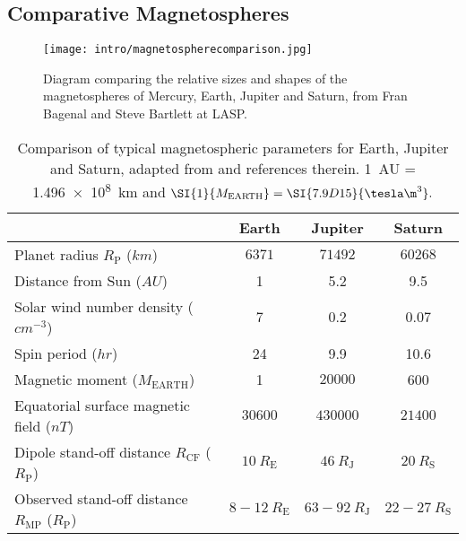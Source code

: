 \subsection{Comparative Magnetospheres}\label{intro:sec:comparativemagnetospheres}
\begin{figure}
\centering
\noindent\texttt{[image: intro/magnetospherecomparison.jpg]}
\caption[Diagram of Mercury, Earth, Jupiter and Saturn magnetospheres.]{Diagram comparing the relative sizes and shapes of the magnetospheres of Mercury, Earth, Jupiter and Saturn, from Fran Bagenal and Steve Bartlett at LASP.}
\label{intro:fig:magnetospherecomparison}
\end{figure}
\begin{table}
\caption[Comparison of typical magnetospheric parameters for Earth, Jupiter and Saturn.]{Comparison of typical magnetospheric parameters for Earth, Jupiter and Saturn, adapted from \citet{bagenal2014} and references therein. \SI{1}{AU} = \SI{1.496e8}{km} and $\SI{1}{M_\mathrm{EARTH}} = \SI{7.9D15}{\tesla \m^3}.$}\label{intro:table:magnetospherecomparison}
\centering
\begin{tabular}{l c c c}
\hline
 																															& Earth						& Jupiter			& Saturn \\
\hline
Planet radius $R_\mathrm{P}$ ($\si{km}$)															& $\num{6371}$										&	$\num{71492}$			&	$\num{60268}$ \\
Distance from Sun ($\si{AU}$)																			&	1							&	5.2						& 9.5		\\
Solar wind number density ($\si{cm^{-3}}$)														& 7							&	0.2						&	0.07		\\
Spin period ($\si{hr}$)																						&	24						& 	9.9						&10.6		\\
Magnetic moment ($\si{M_\mathrm{EARTH}}$)													&	1							&	$\num{20000}$	&	600		\\
Equatorial surface magnetic field ($\si{nT}$)														&	$\num{30600}$					&	$\num{430000}$		&	$\num{21400}	$\\
Dipole stand-off distance $R_\mathrm{CF}$	($\si{R_\mathrm{P}}$) 				&	$\SI{10}{R_\mathrm{E}}$ & $\SI{46}{R_\mathrm{J}}$ & $\SI{20}{R_\mathrm{S}}$ \\
Observed stand-off distance $R_\mathrm{MP}$ ($\si{R_\mathrm{P}}$)			&	$8-\SI{12}{R_\mathrm{E}}$ & $63-\SI{92}{R_\mathrm{J}}$ & $22-\SI{27}{R_\mathrm{S}}$ \\
\hline
\end{tabular}
\end{table}

